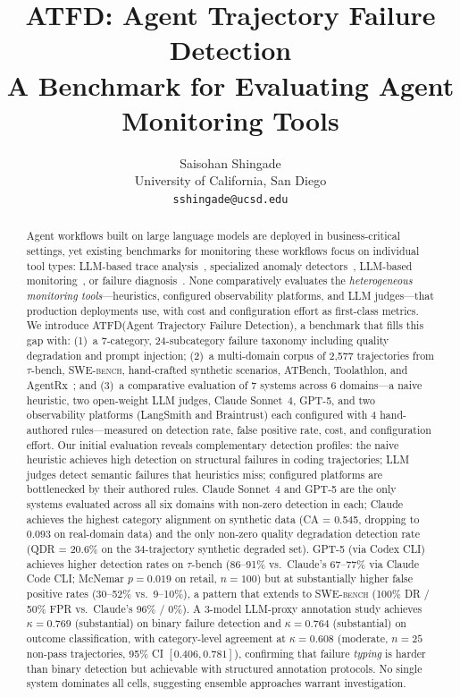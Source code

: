 \documentclass[11pt]{article}
\title{
  \textbf{ATFD: Agent Trajectory Failure Detection} \\[6pt]
  \large A Benchmark for Evaluating Agent Monitoring Tools
}
\author{
  Saisohan Shingade \\
  University of California, San Diego \\
  \texttt{sshingade@ucsd.edu}
}
\date{}
\newcommand{\atfd}{\textsc{ATFD}\xspace}
\newcommand{\taubench}{$\tau$-bench\xspace}
\newcommand{\swebench}{\textsc{SWE-bench}\xspace}
\begin{document}
\maketitle

\begin{abstract}
Agent workflows built on large language models are deployed in
business-critical settings, yet existing benchmarks for monitoring these
workflows focus on individual tool types: LLM-based trace
analysis~\citep{trail2025}, specialized anomaly
detectors~\citep{trajad2025,silentfailures2025}, LLM-based
monitoring~\citep{agentcompass2025}, or failure
diagnosis~\citep{agentrx2026}. None comparatively evaluates the
\emph{heterogeneous monitoring tools}---heuristics, configured
observability platforms, and LLM judges---that production deployments
use, with cost and configuration effort as first-class metrics.
We introduce \atfd (Agent Trajectory Failure Detection), a benchmark that
fills this gap with: (1)~a 7-category, 24-subcategory failure taxonomy
including quality degradation and prompt injection; (2)~a multi-domain
corpus of {2,577} trajectories from \taubench, \swebench, hand-crafted
synthetic scenarios, ATBench, Toolathlon, and
AgentRx~\citep{agentrx2026}; and (3)~a comparative evaluation
of 7 systems across 6 domains---a naive heuristic,
two open-weight LLM judges, Claude Sonnet~4, GPT-5, and two observability
platforms (LangSmith and Braintrust) each configured with 4 hand-authored
rules---measured on detection rate, false positive rate, cost, and
configuration effort.
Our initial evaluation reveals complementary detection profiles: the naive
heuristic achieves high detection on structural failures in coding
trajectories; LLM judges detect semantic failures that heuristics miss;
configured platforms are bottlenecked by their authored rules.
Claude Sonnet~4 and GPT-5 are the only systems evaluated across all six
domains with non-zero detection in each; Claude achieves the highest category
alignment on synthetic data (CA = 0.545, dropping to 0.093 on
real-domain data) and the only non-zero quality degradation detection
rate (QDR = 20.6\% on the 34-trajectory synthetic degraded set).
GPT-5 (via Codex CLI) achieves higher detection rates on \taubench
(86--91\% vs.\ Claude's 67--77\% via Claude Code CLI; McNemar
$p = 0.019$ on retail, $n = 100$) but at substantially higher false
positive rates
(30--52\% vs.\ 9--10\%), a pattern that extends to \swebench
(100\% DR / 50\% FPR vs.\ Claude's 96\% / 0\%).
A 3-model LLM-proxy annotation study achieves $\kappa = 0.769$
(substantial) on binary failure detection and $\kappa = 0.764$
(substantial) on outcome classification, with category-level agreement
at $\kappa = 0.608$ (moderate, $n = 25$ non-pass trajectories,
95\% CI $[0.406, 0.781]$), confirming that failure \emph{typing}
is harder than binary detection but achievable with structured
annotation protocols.
No single system dominates all cells,
suggesting ensemble approaches warrant investigation.
\end{abstract}
\end{document}
